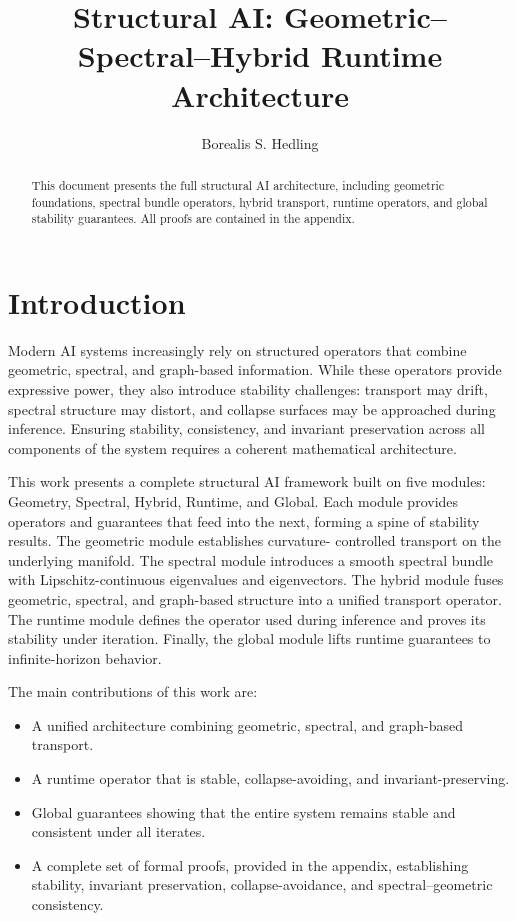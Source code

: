 \documentclass[11pt]{article}
\title{Structural AI: Geometric--Spectral--Hybrid Runtime Architecture}
\author{Borealis S. Hedling}
\date{}
\begin{document}
\maketitle

\begin{abstract}
This document presents the full structural AI architecture, including
geometric foundations, spectral bundle operators, hybrid transport,
runtime operators, and global stability guarantees. All proofs are
contained in the appendix.
\end{abstract}

\section{Introduction}

Modern AI systems increasingly rely on structured operators that combine
geometric, spectral, and graph-based information. While these operators
provide expressive power, they also introduce stability challenges:
transport may drift, spectral structure may distort, and collapse surfaces
may be approached during inference. Ensuring stability, consistency, and
invariant preservation across all components of the system requires a
coherent mathematical architecture.

This work presents a complete structural AI framework built on five
modules: Geometry, Spectral, Hybrid, Runtime, and Global. Each module
provides operators and guarantees that feed into the next, forming a
spine of stability results. The geometric module establishes curvature-
controlled transport on the underlying manifold. The spectral module
introduces a smooth spectral bundle with Lipschitz-continuous eigenvalues
and eigenvectors. The hybrid module fuses geometric, spectral, and
graph-based structure into a unified transport operator. The runtime
module defines the operator used during inference and proves its
stability under iteration. Finally, the global module lifts runtime
guarantees to infinite-horizon behavior.

The main contributions of this work are:

\begin{itemize}
    \item A unified architecture combining geometric, spectral, and
    graph-based transport.
    \item A runtime operator that is stable, collapse-avoiding, and
    invariant-preserving.
    \item Global guarantees showing that the entire system remains stable
    and consistent under all iterates.
    \item A complete set of formal proofs, provided in the appendix,
    establishing stability, invariant preservation, collapse-avoidance,
    and spectral--geometric consistency.
\end{itemize}
\end{document}
